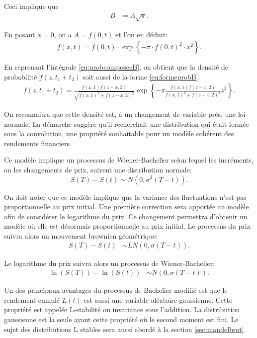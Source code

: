 Ceci implique que 
\begin{align*}
  B&= A\sqrt{\pi}.
\end{align*}

En posant $x=0$, on a $A=f(0,t)$ et l'on en déduit:
\begin{align}
  f(x,t) = f(0,t) \cdot \exp \left\{-\pi \cdot f(0,t)^2 \cdot x^2
  \right\}.
\end{align}

En reprenant l'intégrale \eqref{eq:probcomposeeB}, on obtient que la
densité de probabilité $f(z,t_1+t_2)$ soit aussi de la forme
\eqref{eq:formeprobB}:
\begin{align}
  f(z,t_1+t_2) = \frac{f(x,1)f(z-x,2)}{\sqrt{f(x,1)^2+f(z-x,2)^2}}
  \exp \left\{-\pi \frac{f(x,1)f(z-x,2)}{f(x,1)^2+f(z-x,2)^2} z^2
  \right\}.
\end{align}

On reconnaitra que cette densité est, à un changement de variable
près, une loi normale. La démarche suggère qu'il recherchait une
distribution qui était fermée sous la convolution, une propriété
souhaitable pour un modèle cohérent des rendements financiers.

Ce modèle implique un processus de Wiener-Bachelier selon lequel les
incréments, ou les changements de prix, suivent une distribution
normale:
\begin{equation}
  \label{eq:bachelier00}
  S(T)-S(t) \sim N\left(0,\sigma^2 \left(T-t\right)\right).
\end{equation}

On doit noter que ce modèle implique que la variance des fluctuations
n'est pas proportionnelle au prix initial. Une première correction
sera apportée au modèle afin de considérer le logarithme du prix. Ce
changement permettra d'obtenir un modèle où elle est désormais
proportionnelle au prix initial. Le processus du prix suivra alors un
mouvement brownien géométrique:
\begin{align}
  \label{eq:browniengeom}
  S(T)-S(t) &\sim LN \left(0, \sigma (T-t) \right).
\end{align}

Le logarithme du prix suivra alors un processus de Wiener-Bachelier:
\begin{align}
  \label{eq:bachelierwiener2}
  \ln\left(S(T)\right)-\ln\left(S(t)\right) &\sim N\left(0,\sigma
    \left(T-t\right)\right).
\end{align}

Un des principaux avantages du processus de Bachelier modifié est que
le rendement cumulé $L(t)$ est aussi une variable aléatoire
gaussienne. Cette propriété est appelée L-stabilité ou invariance sous
l'addition. La distribution gaussienne est la seule ayant cette
propriété où le second moment est fini. Le sujet des distributions L
stables sera aussi abordé à la section \ref{sec:mandelbrot}.

